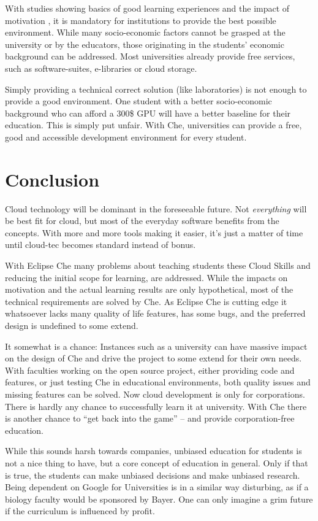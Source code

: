 \documentclass[english,utf8]{lni}
\begin{document}
With studies showing basics of good learning experiences \cite{FI05}\cite{TC88} and the impact of motivation \cite{HU95}\cite{DECI93}, it is mandatory for institutions to provide the best possible environment. 
While many socio-economic factors cannot be grasped at the university or by the educators, those originating in the students' economic background can be addressed.
Most universities already provide free services, such as software-suites, e-libraries or cloud storage.

Simply providing a technical correct solution (like laboratories) is not enough to provide a good environment.
One student with a better socio-economic background who can afford a 300\$ GPU will have a better baseline for their education. 
This is simply put unfair.
With Che, universities can provide a free, good and accessible development environment for every student.
\section{Conclusion}
\label{sec:Conclusion}
Cloud technology will be dominant in the foreseeable future. 
Not \textit{everything} will be best fit for cloud, but most of the everyday software benefits from the concepts. 
With more and more tools making it easier, it's just a matter of time until cloud-tec becomes standard instead of bonus.

With Eclipse Che many problems about teaching students these Cloud Skills and reducing the initial scope for learning, are addressed. 
While the impacts on motivation and the actual learning results are only hypothetical, most of the technical requirements are solved by Che.  
As Eclipse Che is cutting edge it whatsoever lacks many quality of life features, has some bugs, and the preferred design is undefined to some extend. 

It somewhat is a chance: 
Instances such as a university can have massive impact on the design of Che and drive the project to some extend for their own needs. 
With faculties working on the open source project, either providing code and features, or just testing Che in educational environments, both quality issues and missing features can be solved.    
Now cloud development is only for corporations. 
There is hardly any chance to successfully learn it at university. 
With Che there is another chance to “get back into the game” – and provide corporation-free education.  

While this sounds harsh towards companies, unbiased education for students is not a nice thing to have, but a core concept of education in general. 
Only if that is true, the students can make unbiased decisions and make unbiased research. 
Being dependent on Google for Universities is in a similar way disturbing, as if a biology faculty would be sponsored by Bayer. 
One can only imagine a grim future if the curriculum is influenced by profit. 
\end{document}
